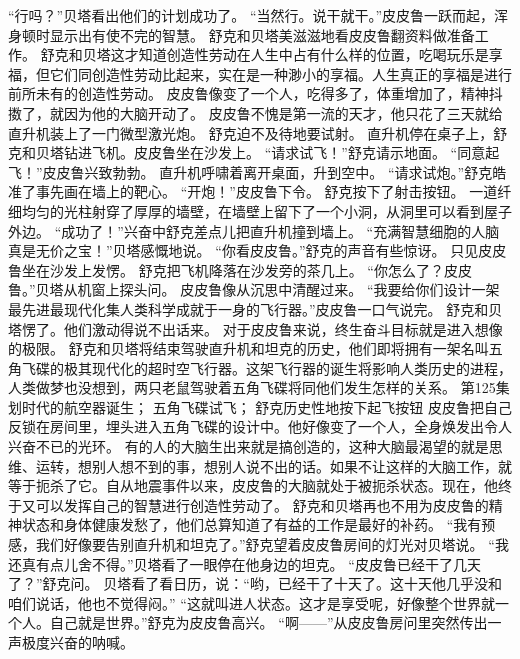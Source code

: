 \documentclass[a4paper,12pt,UTF8,twoside]{ctexbook}
\begin{document}
        “行吗？”贝塔看出他们的计划成功了。 
        “当然行。说干就干。”皮皮鲁一跃而起，浑身顿时显示出有使不完的智慧。 
        舒克和贝塔美滋滋地看皮皮鲁翻资料做准备工作。 
        舒克和贝塔这才知道创造性劳动在人生中占有什么样的位置，吃喝玩乐是享福，但它们同创造性劳动比起来，实在是一种渺小的享福。人生真正的享福是进行前所未有的创造性劳动。 
        皮皮鲁像变了一个人，吃得多了，体重增加了，精神抖擞了，就因为他的大脑开动了。 
        皮皮鲁不愧是第一流的天才，他只花了三天就给直升机装上了一门微型激光炮。 
        舒克迫不及待地要试射。 
        直升机停在桌子上，舒克和贝塔钻进飞机。皮皮鲁坐在沙发上。 
        “请求试飞！”舒克请示地面。 
        “同意起飞！”皮皮鲁兴致勃勃。 
        直升机呼啸着离开桌面，升到空中。 
        “请求试炮。”舒克皓准了事先画在墙上的靶心。 
        “开炮！”皮皮鲁下令。 
        舒克按下了射击按钮。 
        一道纤细均匀的光柱射穿了厚厚的墙壁，在墙壁上留下了一个小洞，从洞里可以看到屋子外边。 
        “成功了！”兴奋中舒克差点儿把直升机撞到墙上。 
        “充满智慧细胞的人脑真是无价之宝！”贝塔感慨地说。 
        “你看皮皮鲁。”舒克的声音有些惊讶。 
        只见皮皮鲁坐在沙发上发愣。 
        舒克把飞机降落在沙发旁的茶几上。 
        “你怎么了？皮皮鲁。”贝塔从机窗上探头问。 
        皮皮鲁像从沉思中清醒过来。 
        “我要给你们设计一架最先进最现代化集人类科学成就于一身的飞行器。”皮皮鲁一口气说完。 
        舒克和贝塔愣了。他们激动得说不出话来。 
        对于皮皮鲁来说，终生奋斗目标就是进入想像的极限。 
        舒克和贝塔将结束驾驶直升机和坦克的历史，他们即将拥有一架名叫五角飞碟的极其现代化的超时空飞行器。这架飞行器的诞生将影响人类历史的进程，人类做梦也没想到，两只老鼠驾驶着五角飞碟将同他们发生怎样的关系。   第125集 
        划时代的航空器诞生； 
        五角飞碟试飞； 
        舒克历史性地按下起飞按钮   
        皮皮鲁把自己反锁在房间里，埋头进入五角飞碟的设计中。他好像变了一个人，全身焕发出令人兴奋不已的光环。 
        有的人的大脑生出来就是搞创造的，这种大脑最渴望的就是思维、运转，想别人想不到的事，想别人说不出的话。如果不让这样的大脑工作，就等于扼杀了它。自从地震事件以来，皮皮鲁的大脑就处于被扼杀状态。现在，他终于又可以发挥自己的智慧进行创造性劳动了。 
        舒克和贝塔再也不用为皮皮鲁的精神状态和身体健康发愁了，他们总算知道了有益的工作是最好的补药。 
        “我有预感，我们好像要告别直升机和坦克了。”舒克望着皮皮鲁房间的灯光对贝塔说。 
        “我还真有点儿舍不得。”贝塔看了一眼停在他身边的坦克。 
        “皮皮鲁已经干了几天了？”舒克问。 
        贝塔看了看日历，说：“哟，已经干了十天了。这十天他几乎没和咱们说话，他也不觉得闷。” 
        “这就叫进人状态。这才是享受呢，好像整个世界就一个人。自己就是世界。”舒克为皮皮鲁高兴。 
        “啊——”从皮皮鲁房问里突然传出一声极度兴奋的呐喊。 
\end{document}

